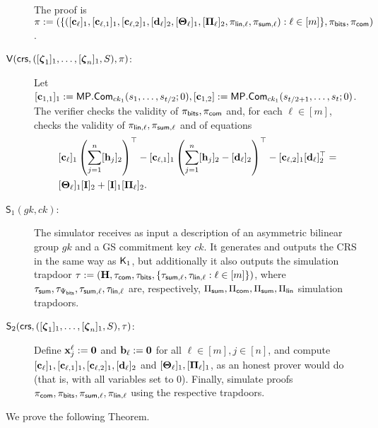 \begin{description}
The proof is \(\pi:=(\{([\mathbf{c}_\ell]_1,[\mathbf{c}_{\ell,1}]_1,[\mathbf{c}_{\ell,2}]_1,[\mathbf{d}_\ell]_2,[\mathbf{{\Theta}}_\ell]_1,[\mathbf{{\Pi}}_\ell]_2,\pi_{\mathsf{lin},\ell},\pi_{\mathsf{sum},\ell}):\ell\in [m]\},\pi_{\mathsf{bits}},\pi_{\mathsf{com}})\).

\item[{\(\mathsf{V}(\mathsf{crs},([{\boldsymbol \zeta}_1]_1, \ldots, [{\boldsymbol \zeta}_n]_1,S),\pi)\)}:]
Let \([\mathbf{c}_{1,1}]_1:=\mathsf{MP}.\mathsf{Com}_{ck_1}(s_1,\ldots,s_{t /2};0),[\mathbf{c}_{1,2}]:=\mathsf{MP}.\mathsf{Com}_{ck_1}(s_{t /2+1},\ldots,s_{t };0)\). The verifier checks the validity of \(\pi_{\mathsf{bits}},\pi_{\mathsf{com}}\) 
and, for each \(\ell\in [m]\), checks the validity of \(\pi_{\mathsf{lin},\ell},\pi_{\mathsf{sum},\ell}\) and of equations
\begin{align}
&[\mathbf{c}_\ell]_1\left(\sum_{j=1}^n [\mathbf{h}_j]_2\right)^\top-
[\mathbf{c}_{\ell,1}]_1\left(\sum_{j=1}^n[\mathbf{h}_j]_2-[\mathbf{d}_\ell]_2\right)^\top-
[\mathbf{c}_{\ell,2}]_1[\mathbf{d}_\ell]_2^\top = \nonumber\\
&[\mathbf{{\Theta}}_\ell]_1[\mathbf{{I}}]_2+[\mathbf{{I}}]_1[\mathbf{{\Pi}}_\ell]_2.  \label{eq-alog-5}
\end{align}

\item[{\(\mathsf{S}_1({gk},ck)\):}] The simulator receives as input a description of an asymmetric bilinear group \({gk}\) and a GS commitment key $ck$. It generates and outputs the CRS in the same way as \(\mathsf{K}_1\), but additionally it also  outputs the simulation trapdoor 
\(\tau:=(\mathbf{{H}},\tau_{\mathsf{com}},\tau_{\mathsf{bits}},\{\tau_{\mathsf{sum},\ell},\tau_{\mathsf{lin},\ell}:\ell\in [m]\})\),
where \(\tau_{\mathsf{sum}},\tau_{\Psi_{\mathsf{bits}}},\tau_{\mathsf{sum},\ell},\tau_{\mathsf{lin,\ell}}\) are, respectively, \({\Pi_{\mathsf{sum}}},{\Pi_{\mathsf{com}}},\Pi_{\mathsf{sum}},\Pi_\mathsf{lin}\) simulation trapdoors.

\item[{\(\mathsf{S}_2(\mathsf{crs},([{\boldsymbol \zeta}_1]_1,\ldots,[{\boldsymbol \zeta}_n]_1,S),\tau)\):}] Define \(\mathbf{x}^\ell_j:=\mathbf{0}\) and \(\mathbf{b}_\ell:=\mathbf{0}\) for all \(\ell\in [m],j\in[n]\), and compute \([\mathbf{c}_\ell]_1, [\mathbf{c}_{\ell,1}]_1,[\mathbf{c}_{\ell,2}]_1,[\mathbf{d}_\ell]_2\) and \([\mathbf{{\Theta}}_\ell]_1,[\mathbf{{\Pi}}_\ell]_1\), as an honest prover would do (that is, with all variables set to 0).
Finally, simulate proofs \(\pi_{\mathsf{com}},\pi_{\mathsf{bits}},\pi_{\mathsf{sum},\ell},\pi_{\mathsf{lin},\ell}\) using the respective trapdoors.
\end{description}

We prove the following Theorem.

